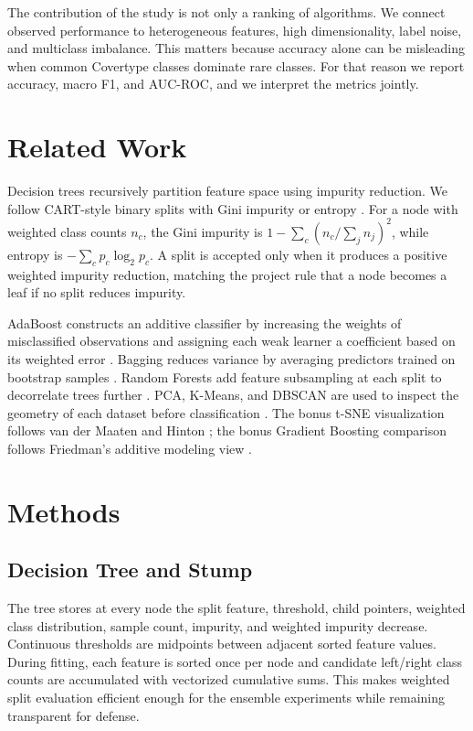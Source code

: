 \documentclass[conference]{IEEEtran}
\begin{document}
The contribution of the study is not only a ranking of algorithms. We connect
observed performance to heterogeneous features, high dimensionality, label
noise, and multiclass imbalance. This matters because accuracy alone can be
misleading when common Covertype classes dominate rare classes.
For that reason we report accuracy, macro F1, and AUC-ROC, and we interpret
the metrics jointly.

\section{Related Work}
Decision trees recursively partition feature space using impurity reduction.
We follow CART-style binary splits with Gini impurity or entropy
\cite{hastie2009elements,quinlan1986induction}. For a node with weighted
class counts $n_c$, the Gini impurity is
$1-\sum_c (n_c/\sum_j n_j)^2$, while entropy is
$-\sum_c p_c\log_2 p_c$. A split is accepted only when it produces a positive
weighted impurity reduction, matching the project rule that a node becomes a
leaf if no split reduces impurity.

AdaBoost constructs an additive classifier by increasing the weights of
misclassified observations and assigning each weak learner a coefficient
based on its weighted error \cite{freund1997decision}. Bagging reduces
variance by averaging predictors trained on bootstrap samples
\cite{breiman1996bagging}. Random Forests add feature subsampling at each
split to decorrelate trees further \cite{breiman2001random}. PCA, K-Means,
and DBSCAN are used to inspect the geometry of each dataset before
classification \cite{pearson1901lines,lloyd1982least,ester1996density}. The
bonus t-SNE visualization follows van der Maaten and Hinton
\cite{maaten2008visualizing}; the bonus Gradient Boosting comparison follows
Friedman's additive modeling view \cite{friedman2001greedy}.

\section{Methods}
\subsection{Decision Tree and Stump}
The tree stores at every node the split feature, threshold, child pointers,
weighted class distribution, sample count, impurity, and weighted impurity
decrease. Continuous thresholds are midpoints between adjacent sorted feature
values. During fitting, each feature is sorted once per node and candidate
left/right class counts are accumulated with vectorized cumulative sums.
This makes weighted split evaluation efficient enough for the ensemble
experiments while remaining transparent for defense.
\end{document}
